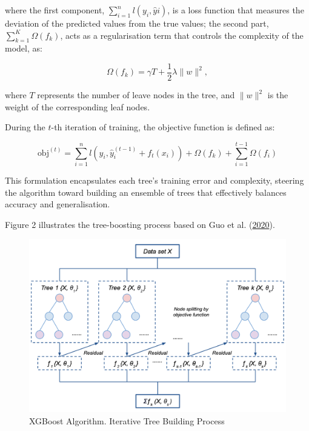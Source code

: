 \documentclass[
  11pt,
]{article}
\begin{document}
where the first component, \(\sum_{i=1}^{n} l(y_i, \hat{y}i)\), is a
loss function that measures the deviation of the predicted values from
the true values; the second part, \(\sum_{k=1}^{K} \Omega(f_k)\), acts
as a regularisation term that controls the complexity of the model, as:

\begin{equation}
\Omega(f_k) = \gamma T + \frac{1}{2} \lambda \lVert w \rVert^2,
\end{equation}

where \(T\) represents the number of leave nodes in the tree, and
\(\lVert w \rVert^2\) is the weight of the corresponding leaf nodes.

During the \(t\)-th iteration of training, the objective function is
defined as:

\begin{equation}
\text{obj}^{(t)} = \sum_{i=1}^{n} l\left(y_i, \hat{y}_i^{(t-1)} + f_t(x_i)\right) + \Omega(f_k) + \sum_{i=1}^{t-1} \Omega(f_i)
\end{equation}

This formulation encapsulates each tree's training error and complexity,
steering the algorithm toward building an ensemble of trees that
effectively balances accuracy and generalisation.

Figure 2 illustrates the tree-boosting process based on Guo et al.
(\protect\hyperlink{ref-Guo2020}{2020}).

\begin{figure}[H]

{\centering \includegraphics[width=0.9\linewidth]{xgboost_flow} 

}

\caption{XGBoost Algorithm. Iterative Tree Building Process}\label{fig:XGBoost flow}
\end{figure}
\end{document}
